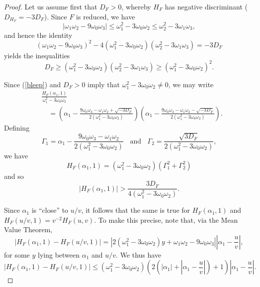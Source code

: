 \begin{proof}
Let us assume first  that $D_F > 0$, whereby $H_F$ has negative discriminant ($D_{H_F}=-3 D_F$).  Since $F$ is reduced, we have
$$
| \omega_1 \omega_2 -9 \omega_0 \omega_3| \leq \omega_1^2-3\omega_0 \omega_2 \leq \omega_2^2 - 3 \omega_1 \omega_3,
$$
and hence the identity
\begin{equation} \label{bleep}
(\omega_1 \omega_2 -9 \omega_0 \omega_3)^2 - 4 (\omega_1^2-3\omega_0 \omega_2) (\omega_2^2 - 3 \omega_1 \omega_3) = - 3 D_F
\end{equation}
yields the inequalities
\begin{equation} \label{bleep2}
D_F \geq  (\omega_1^2-3\omega_0 \omega_2) (\omega_2^2 - 3 \omega_1 \omega_3) \geq (\omega_1^2-3\omega_0 \omega_2)^2.
\end{equation}

Since (\ref{bleep}) and $D_F > 0$ imply that $\omega_1^2-3\omega_0 \omega_2 \neq 0$,
we may write
\begin{align*}
& \frac{H_F (\alpha_1,1)}{ \omega_1^2-3\omega_0 \omega_2} \\
& \quad=  \left(\alpha_1 -  \frac{9 \omega_0 \omega_3 - \omega_1 \omega_2 + \sqrt{-3 D_F}}{2 (\omega_1^2-3\omega_0 \omega_2)} \right) \left(\alpha_1 -  \frac{9 \omega_0 \omega_3 - \omega_1 \omega_2 - \sqrt{-3 D_F}}{2 (\omega_1^2-3\omega_0 \omega_2)} \right).
\end{align*}
Defining
$$
\Gamma_1 = \alpha_1 -  \frac{9 \omega_0 \omega_3 - \omega_1 \omega_2 }{2 (\omega_1^2-3\omega_0 \omega_2)} \; \; \mbox{ and } \; \; 
\Gamma_2 = \frac{\sqrt{3 D_F}}{2 (\omega_1^2-3\omega_0 \omega_2)},
$$
we have
$$
H_F (\alpha_1,1) = \left( \omega_1^2-3\omega_0 \omega_2 \right) \left( \Gamma_1^2+\Gamma_2^2 \right)
$$
and so
\begin{equation} \label{pos-case}
|H_F(\alpha_1,1)| > \frac{3 D_F}{4 (\omega_1^2-3\omega_0 \omega_2)}.
\end{equation}

Since $\alpha_1$ is ``close'' to $u/v$, it follows that the same is true for $H_F(\alpha_1,1)$ and $H_F(u/v,1) = v^{-2} H_F(u,v)$. To make this precise, note that, 
via the Mean Value Theorem,
\begin{equation} \label{general}
\left| H_F (\alpha_1,1) - H_F (u/v,1) \right| = \left| 2 ( \omega_1^2-3\omega_0 \omega_2) y + \omega_1 \omega_2 -9 \omega_0 \omega_3 \right|
\left| \alpha_1 - \frac{u}{v} \right|,
\end{equation}
for some $y$ lying between $\alpha_1$ and $u/v$. We thus have
\begin{equation} \label{wobbly}
\left| H_F (\alpha_1,1) - H_F (u/v,1) \right| \leq  ( \omega_1^2-3\omega_0 \omega_2) \left( 2 \left( |\alpha_1| + \left| \alpha_1 - \frac{u}{v} \right| \right) +1 \right) \left| \alpha_1 - \frac{u}{v} \right|.
\end{equation}


\end{proof}

